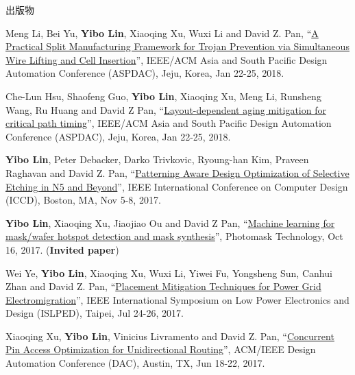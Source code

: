 \begin{rSection}{出版物}
\begin{description}[font=\normalfont, rightmargin=2em]
{}
            

\item[{[C15]}]{
        Meng Li, Bei Yu, \textbf{Yibo Lin}, Xiaoqing Xu, Wuxi Li and David Z. Pan, 
    ``\href{https://doi.org/10.1109/ASPDAC.2018.8297316}{A Practical Split Manufacturing Framework for Trojan Prevention via Simultaneous Wire Lifting and Cell Insertion}'', 
    IEEE/ACM Asia and South Pacific Design Automation Conference (ASPDAC), Jeju, Korea, Jan 22-25, 2018.
    
}
            

\item[{[C14]}]{
        Che-Lun Hsu, Shaofeng Guo, \textbf{Yibo Lin}, Xiaoqing Xu, Meng Li, Runsheng Wang, Ru Huang and David Z Pan, 
    ``\href{https://doi.org/10.1109/ASPDAC.2018.8297298}{Layout-dependent aging mitigation for critical path timing}'', 
    IEEE/ACM Asia and South Pacific Design Automation Conference (ASPDAC), Jeju, Korea, Jan 22-25, 2018.
    
}
            

\item[{[C13]}]{
        \textbf{Yibo Lin}, Peter Debacker, Darko Trivkovic, Ryoung-han Kim, Praveen Raghavan and David Z. Pan, 
    ``\href{https://doi.org/10.1109/ICCD.2017.72}{Patterning Aware Design Optimization of Selective Etching in N5 and Beyond}'', 
    IEEE International Conference on Computer Design (ICCD), Boston, MA, Nov 5-8, 2017.
    
}
            

\item[{[C12]}]{
        \textbf{Yibo Lin}, Xiaoqing Xu, Jiaojiao Ou and David Z Pan, 
    ``\href{http://dx.doi.org/10.1117/12.2282943}{Machine learning for mask/wafer hotspot detection and mask synthesis}'', 
    Photomask Technology, Oct 16, 2017.
    (\textbf{Invited paper})
}
            

\item[{[C11]}]{
        Wei Ye, \textbf{Yibo Lin}, Xiaoqing Xu, Wuxi Li, Yiwei Fu, Yongsheng Sun, Canhui Zhan and David Z. Pan, 
    ``\href{https://doi.org/10.1109/ISLPED.2017.8009178}{Placement Mitigation Techniques for Power Grid Electromigration}'', 
    IEEE International Symposium on Low Power Electronics and Design (ISLPED), Taipei, Jul 24-26, 2017.
    
}
            

\item[{[C10]}]{
        Xiaoqing Xu, \textbf{Yibo Lin}, Vinicius Livramento and David Z. Pan, 
    ``\href{https://doi.org/10.1145/3061639.3062214}{Concurrent Pin Access Optimization for Unidirectional Routing}'', 
    ACM/IEEE Design Automation Conference (DAC), Austin, TX, Jun 18-22, 2017.
    
}
\end{description}
\end{rSection}
